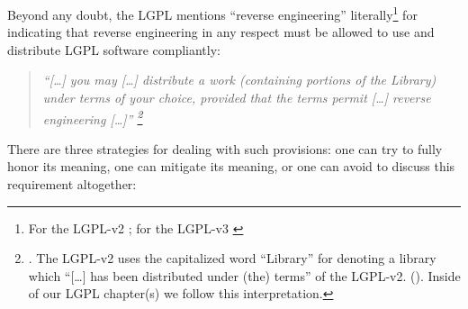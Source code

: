 %
%
%
%
%



Beyond any doubt, the LGPL mentions \enquote{reverse engineering}
literally\footnote{For the LGPL-v2 \cite[cf.][\nopage wp., 
§6]{Lgpl21OsiLicense1999a}; for the LGPL-v3 \cite[cf.][\nopage wp., 
§4]{Lgpl30OsiLicense2007a} } for indicating that reverse engineering in any
respect must be allowed to use and distribute LGPL software compliantly:

\begin{quote}\noindent\emph{\enquote{[\ldots] you may [\ldots] distribute a work
(containing portions of the Library) under terms of your choice, provided that
the terms permit [\ldots] \emph{reverse engineering} [\ldots]}
\footnote{\cite[cf.][\nopage wp, §6]{Lgpl21OsiLicense1999a}. The LGPL-v2 uses
the capitalized word \enquote{Library} for denoting a library which
\enquote{[\ldots] has been distributed under (the) terms} of the LGPL-v2.
(\cite[cf.][\nopage wp, §0]{Lgpl21OsiLicense1999a}). Inside of our LGPL
chapter(s) we follow this interpretation. } }
\end{quote}

There are three strategies for dealing with such provisions: one can try to
fully honor its meaning, one can mitigate its meaning, or one can avoid to
discuss this requirement altogether:

